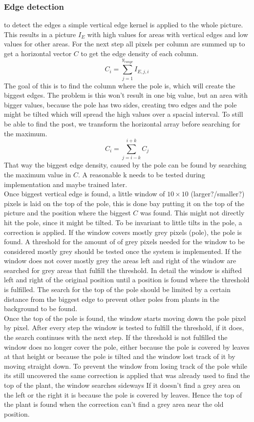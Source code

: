 \subsubsection{Edge detection}
to detect the edges a simple vertical edge kernel is applied to the whole picture. This results in a picture $I_E$ with high values for areas with vertical edges and low values for other areas. For the next step all pixels per column are summed up to get a horizontal vector $C$ to get the edge density of each column.
$$C_i = \sum_{j=1}^{y_{range}} I_{E,j,i}$$
The goal of this is to find the column where the pole is, which will create the biggest edges. The problem is this won't result in one big value, but an area with bigger values, because the pole has two sides, creating two edges and the pole might be tilted which will spread the high values over a spacial interval. To still be able to find the post, we transform the horizontal array before searching for the maximum. 
$$C_{i} = \sum_{j=i-k}^{i+k} C_j$$
That way the biggest edge density, caused by the pole can be found by searching the maximum value in $C$. A reasonable k needs to be tested during implementation and maybe trained later.\\
Once biggest vertical edge is found, a little window of $10\times10$ (larger?/smaller?) pixels is laid on the top of the pole, this is done bay putting it on the top of the picture and the position where the biggest $C$ was found. This might not directly hit the pole, since it might be tilted. To be invariant to little tilts in the pole, a correction is applied. If the window covers mostly grey pixels (pole), the pole is found. A threshold for the amount of of grey pixels needed for the window to be considered mostly grey should be tested once the system is implemented. If the window does not cover mostly grey the areas left and right of the window are searched for grey areas that fulfill the threshold. In detail the window is shifted left and right of the original position until a position is found where the threshold is fulfilled. The search for the top of the pole should be limited by a certain distance from the biggest edge to prevent other poles from plants in the background to be found.\\
Once the top of the pole is found, the window starts moving down the pole pixel by pixel. After every step the window is tested to fulfill the threshold, if it does, the search continues with the next step. If the threshold is not fulfilled the window does no longer cover the pole, either because the pole is covered by leaves at that height or because the pole is tilted and the window lost track of it by moving straight down. To prevent the window from losing track of the pole while its still uncovered the same correction is applied that was already used to find the top of the plant, the window searches sideways If it doesn't find a grey area on the left or the right it is because the pole is covered by leaves. Hence the top of the plant is found when the correction can't find a grey area near the old position.\\ 
